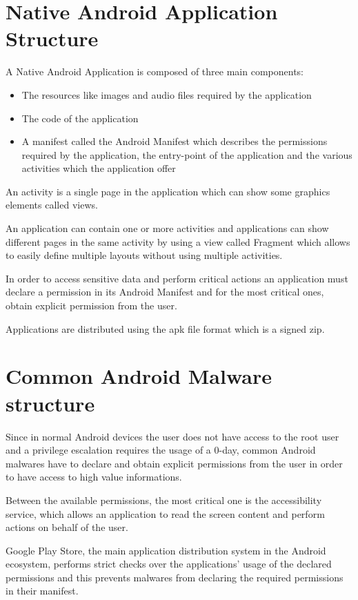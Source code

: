 \section{Native Android Application
Structure}\label{native-android-application-structure}

A Native Android Application is composed of three main components:

\begin{itemize}
\tightlist
\item
  The resources like images and audio files required by the application
\item
  The code of the application
\item
  A manifest called the Android Manifest which describes the permissions
  required by the application, the entry-point of the application and
  the various activities which the application offer
\end{itemize}

An activity is a single page in the application which can show some
graphics elements called views.

An application can contain one or more activities and applications can
show different pages in the same activity by using a view called
Fragment which allows to easily define multiple layouts without using
multiple activities.

In order to access sensitive data and perform critical actions an
application must declare a permission in its Android Manifest and for
the most critical ones, obtain explicit permission from the user.

Applications are distributed using the apk file format which is a signed
zip.

\section{Common Android Malware
structure}\label{common-android-malware-structure}

Since in normal Android devices the user does not have access to the
root user and a privilege escalation requires the usage of a 0-day,
common Android malwares have to declare and obtain explicit permissions
from the user in order to have access to high value informations.

Between the available permissions, the most critical one is the
accessibility service, which allows an application to read the screen
content and perform actions on behalf of the user.

Google Play Store, the main application distribution system in the
Android ecosystem, performs strict checks over the applications' usage
of the declared permissions and this prevents malwares from declaring
the required permissions in their manifest.

